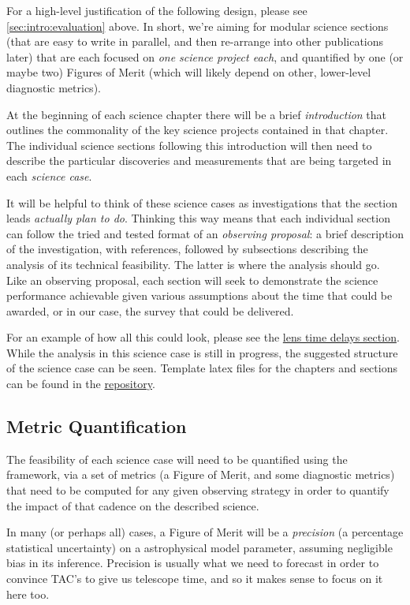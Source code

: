 For a high-level justification of the following design, please see
\autoref{sec:intro:evaluation} above. In short, we're aiming for modular
science sections (that are easy to write in parallel, and then
re-arrange into other publications later) that are each focused on {\it
one science project each}, and quantified by one (or maybe two) Figures
of Merit (which will likely depend on other, lower-level diagnostic
metrics).

At the beginning of each science chapter there will be a brief
\textit{introduction} that outlines the commonality of the key science
projects contained in that chapter. The individual science sections
following this introduction will then need to describe the particular
discoveries and measurements that are being targeted in each
\textit{science case}.

It will be helpful to think of these science
cases as investigations that the section leads {\it actually plan to
do}. Thinking this way means that each individual section can follow the
tried and tested format of an {\it observing proposal}: a brief
description of the investigation, with references, followed by subsections
describing the analysis
of its technical feasibility. The latter is where the \MAF analysis
should go. Like an observing proposal, each section will seek to
demonstrate the science performance achievable given various assumptions
about the time that could be awarded, or in our case, the survey that
could be delivered.

For an example of how all this could look, please see the
\hyperref[sec:lenstimedelays]{lens time delays section}. While the \MAF
analysis in this science case is still in progress, the suggested
structure of the science case can be seen. Template latex files for the
chapters and sections can be found in the
\href{https://github.com/LSSTScienceCollaborations/ObservingStrategy}{\GitHub
repository}.


\subsection{Metric Quantification}
\label{sec:\secname:metrics}

The feasibility of each science case will need to be quantified using
the \MAF framework, via a set of metrics (a Figure of Merit, and some
diagnostic metrics)  that need to be computed for any given observing
strategy in order to quantify the impact of that cadence on the
described science.

In many (or perhaps all) cases, a Figure of Merit will be a
\textit{precision} (\ie a percentage statistical uncertainty) on a
astrophysical model parameter, assuming negligible bias in its
inference. Precision is usually what we need to forecast in order to
convince TAC's to give us telescope time, and so it makes sense to focus
on it here too.

